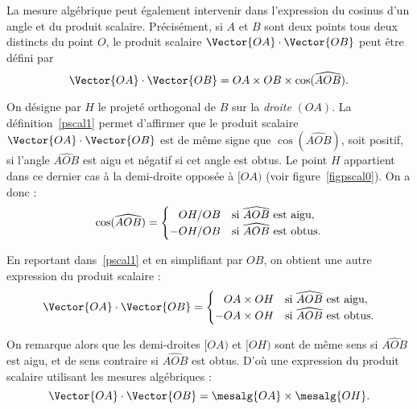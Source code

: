 \begin{remark}
La mesure algébrique peut également intervenir dans l'expression du cosinus d'un angle et du produit scalaire. Précisément, si $A$ et $B$ sont deux points tous deux distincts du point $O$, le produit scalaire $\Vector{OA}\cdot\Vector{OB}$ peut être défini par 
\begin{equation}\Vector{OA}\cdot\Vector{OB}=OA\times OB\times \cos(\widehat{AOB}).\label{pscal1}
\end{equation}

On désigne par $H$ le projeté orthogonal de $B$ sur la \emph{droite} $(OA)$.
La définition~\eqref{pscal1} permet d'affirmer que le produit scalaire $\Vector{OA}\cdot\Vector{OB}$ est de même signe que $\cos(\widehat{AOB})$, soit positif, si l'angle $\widehat{AOB}$ est aigu et négatif si cet angle est obtus. Le point $H$ appartient dans ce  dernier cas à la demi-droite opposée à $[OA)$ (voir figure~\ref{figpscal0}). On a donc :
\begin{equation*}
\cos(\widehat{AOB})=
\begin{cases}
\hphantom{-}OH/OB&\text{si $\widehat{AOB}$ est aigu},\\
-OH/OB&\text{si $\widehat{AOB}$ est obtus}.\\
\end{cases}
\end{equation*}

En reportant dans~\eqref{pscal1} et en simplifiant par $OB$, on obtient une autre expression du produit scalaire :
\begin{equation*}
\Vector{OA}\cdot\Vector{OB}=
\begin{cases}
\hphantom{-}OA\times OH&\text{si $\widehat{AOB}$ est aigu},\\
-OA\times OH&\text{si $\widehat{AOB}$ est obtus}.
\end{cases}%
\end{equation*}



On remarque alors que les demi-droites $[OA)$ et $[OH)$ sont de même sens si $\widehat{AOB}$ est aigu, et de sens contraire si $\widehat{AOB}$ est obtus. D'où une expression du produit scalaire utilisant les mesures algébriques :
\begin{equation}
\Vector{OA}\cdot\Vector{OB}=\mesalg{OA}\times\mesalg{OH}.\label{pscal0}
\end{equation}


\end{remark}
